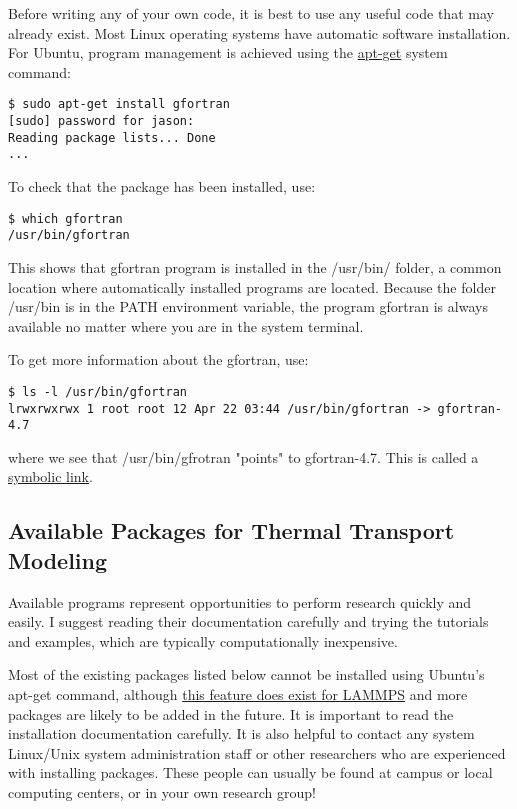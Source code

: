 Before writing any of your own code, it is best to use any useful 
code that may already exist. 
Most Linux operating systems have automatic software installation. 
For Ubuntu, program  management is achieved using the 
\href{https://help.ubuntu.com/community/AptGet/Howto}{apt-get} 
system command:

\begin{lstlisting}
$ sudo apt-get install gfortran
[sudo] password for jason: 
Reading package lists... Done
...
\end{lstlisting}
To check that the package has been installed, use:
\begin{lstlisting}
$ which gfortran
/usr/bin/gfortran
\end{lstlisting}
This shows that gfortran program is installed in the /usr/bin/ folder, 
a common location where automatically installed programs are located. 
Because the 
folder /usr/bin is in the PATH environment variable, 
the program gfortran is always available no matter where you are in 
the system terminal. 

To get more information about the gfortran, use:
\begin{lstlisting}
$ ls -l /usr/bin/gfortran
lrwxrwxrwx 1 root root 12 Apr 22 03:44 /usr/bin/gfortran -> gfortran-4.7
\end{lstlisting}
where we see that /usr/bin/gfrotran "points" to gfortran-4.7. 
This is called a 
\href{http://en.wikipedia.org/wiki/Symbolic_link}{symbolic link}.

\subsection{\label{A:Comp_Env:Avail}Available Packages for 
Thermal Transport Modeling}

Available programs represent opportunities to perform research quickly 
and easily. I suggest reading their documentation carefully and trying 
the tutorials and examples, which are typically computationally 
inexpensive. 

Most of the existing packages listed below cannot be installed using 
Ubuntu's apt-get command, although 
\href{http://lammps.sandia.gov/download.html#ubuntu}
{this feature does exist for LAMMPS} and more packages are likely 
to be added in the future. It is important to read the installation 
documentation carefully. It is also helpful to contact any system 
Linux/Unix system administration staff or other researchers who are 
experienced with installing packages. These people can usually be 
found at campus or local computing centers, or in your own 
research group! 

